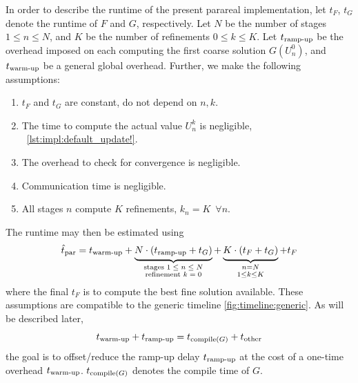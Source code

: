 In order to describe the runtime of the present parareal implementation,
let $t_F$, $t_G$ denote the runtime of $F$ and $G$, respectively.
Let $N$ be the number of stages $1 \leq n \leq N$,
and $K$ be the number of refinements $0 \leq k \leq K$.
Let $t_\text{ramp-up}$ be the overhead imposed on each computing the first coarse solution $G(U_n^0)$,
and $t_\text{warm-up}$ be a general global overhead.
Further, we make the following assumptions:
\begin{enumerate}
  \item
    $t_F$ and $t_G$ are constant, \ie do not depend on $n, k$.
  \item
    \label{item:impl:assumption:tU}
    The time to compute the actual value $U_n^k$ is negligible,
    \cf~\autoref{lst:impl:default_update!}.
  \item
    The overhead to check for convergence is negligible.
  \item
    Communication time is negligible.
  \item
    All stages $n$ compute $K$ refinements, \ie $k_n = K \enspace\forall n$.
\end{enumerate}
The runtime may then be estimated using
\begin{equation}
\label{eq:impl:tpar}
  \hattpar
  = \twarmup
  + \underbrace{
    \strut
    N \cdot (\trampup + t_G)
  }_{\substack{
    \text{stages $1\leq n\leq N$}\\
    \text{refinement $k=0$}
  }}
  + \underbrace{
    \strut
    K \cdot (t_F + t_G)
  }_{\substack{
    \vphantom{\text{stage}}
    n = N \\
    1 \leq k \leq K
  }}
  + t_F
\end{equation}
where the final $t_F$ is to compute the best fine solution available.
These assumptions are compatible to the generic timeline \autoref{fig:timeline:generic}.
As will be described later,
\begin{equation}
  t_\text{warm-up} + t_\text{ramp-up}
  = t_{\operatorname{compile}(G)} + t_\text{other}
\end{equation}
\ie the goal is to offset/reduce the ramp-up delay $t_\text{ramp-up}$
at the cost of a one-time overhead $t_\text{warm-up}$.
$t_{\operatorname{compile}(G)}$ denotes the compile time of $G$.

